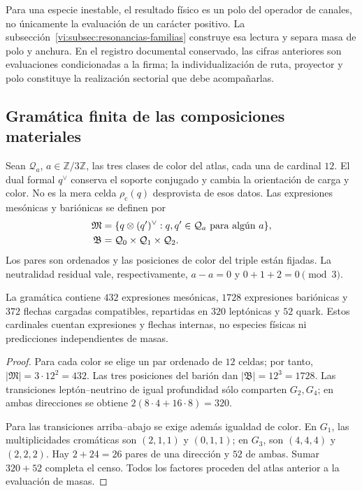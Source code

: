 Para una especie inestable, el resultado físico es un polo del operador
de canales, no únicamente la evaluación de un carácter positivo. La
subsección~\ref{vi:subsec:resonancias-familias} construye esa lectura y
separa masa de polo y anchura. En el registro documental conservado,
las cifras anteriores son evaluaciones condicionadas a la firma; la
individualización de ruta, proyector y polo constituye la realización
sectorial que debe acompañarlas.

\subsection{Gramática finita de las composiciones materiales}
\label{vi:subsec:gramatica-compuestos}

Sean \(\mathcal Q_a\), \(a\in\mathbb Z/3\mathbb Z\), las tres
clases de color del atlas, cada una de cardinal \(12\). El dual formal
\(q^\vee\) conserva el soporte conjugado y cambia la orientación de
carga y color. No es la mera celda \(\rho_{\mathrm c}(q)\) desprovista
de esos datos. Las expresiones mesónicas y bariónicas se definen por
\begin{align}
 \mathfrak M&=\{q\otimes(q')^\vee:
 q,q'\in\mathcal Q_a\text{ para algún }a\},\notag\\
 \mathfrak B&=\mathcal Q_0\times\mathcal Q_1\times\mathcal Q_2.
 \label{vi:eq:gramatica-meson-barion}
\end{align}
Los pares son ordenados y las posiciones de color del triple están
fijadas. La neutralidad residual vale, respectivamente,
\(a-a=0\) y \(0+1+2=0\pmod3\).

\begin{proposition}
\label{vi:prop:censo-compuestos}
La gramática contiene \(432\) expresiones mesónicas, \(1728\)
expresiones bariónicas y \(372\) flechas cargadas compatibles, repartidas
en \(320\) leptónicas y \(52\) quark. Estos cardinales cuentan
expresiones y flechas internas, no especies físicas ni predicciones
independientes de masas.
\end{proposition}
\begin{proof}
Para cada color se elige un par ordenado de \(12\) celdas; por tanto,
\(|\mathfrak M|=3\cdot12^2=432\). Las tres posiciones del barión dan
\(|\mathfrak B|=12^3=1728\). Las transiciones leptón--neutrino de
igual profundidad sólo comparten \(G_2,G_4\); en ambas direcciones se
obtiene \(2(8\cdot4+16\cdot8)=320\).

Para las transiciones arriba--abajo se exige además igualdad de color.
En \(G_1\), las multiplicidades cromáticas son \((2,1,1)\) y
\((0,1,1)\); en \(G_3\), son \((4,4,4)\) y \((2,2,2)\).
Hay \(2+24=26\) pares de una dirección y \(52\) de ambas. Sumar
\(320+52\) completa el censo. Todos los factores proceden del atlas
anterior a la evaluación de masas.
\end{proof}

